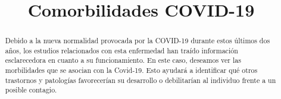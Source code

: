 \documentclass{bmcart}
\begin{document}
	\begin{frontmatter}
	
		\begin{fmbox}
			
			
			\title{Comorbilidades COVID-19}
			
			
			\author[
			  addressref={aff1},                   %
			  corref={aff1},                       %
			  email={inesdiazdelrey@gmail.com}   %
			]{ } %
			\author[
			  addressref={aff1},
			  email={rythemond@gmail.com}
			]{ }
			\author[
			addressref={aff1},
			email={claauudiiaa24@gmail.com}
			]{ }
			
			
			\address[id=aff1]{%
			  ,             %
			  ,          %
			  ,                              %
			}
		
		\end{fmbox}%
		
		\begin{abstractbox}
		
			\begin{abstract} 
			

			Debido a la nueva normalidad provocada por la COVID-19 durante estos últimos dos años, los estudios relacionados con esta enfermedad han traído información esclarecedora en cuanto a su funcionamiento. En este caso, deseamos ver las morbilidades que se asocian con la Covid-19. Esto ayudará a identificar qué otros trastornos y patologías favorecerían su desarrollo o debilitarían al individuo frente a un posible contagio.


\end{abstract}
\end{abstractbox}
\end{frontmatter}
\end{document}
